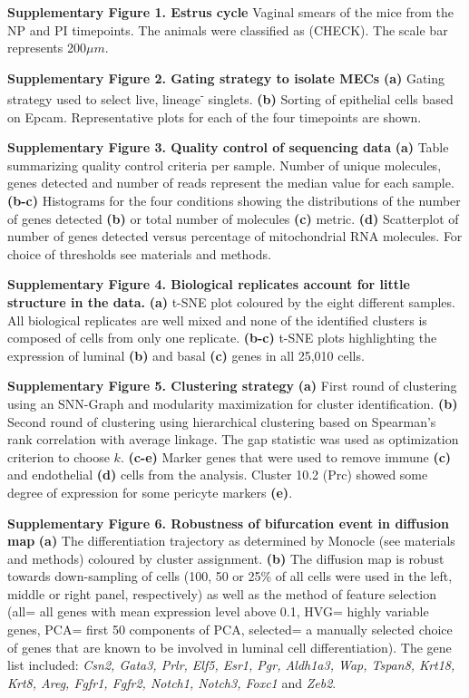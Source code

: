 \documentclass[titlepage, 12pt, oneside]{amsart}
\begin{document}
\textbf{Supplementary Figure 1. Estrus cycle}
Vaginal smears of the mice from the NP and PI timepoints. The animals were classified as (CHECK). The scale bar represents 200$\mu m$.

\textbf{Supplementary Figure 2. Gating strategy to isolate MECs}
\textbf{(a)} Gating strategy used to select live, lineage\textsuperscript{-} singlets.
\textbf{(b)} Sorting of epithelial cells based on Epcam. Representative plots for each of the four timepoints are shown.

\textbf{Supplementary Figure 3. Quality control of sequencing data}
\textbf{(a)} Table summarizing quality control criteria per sample.
Number of unique molecules, genes detected and number of reads represent the median value for each sample.
\textbf{(b-c)} Histograms for the four conditions showing the distributions of the number of genes detected \textbf{(b)} or total number of molecules \textbf{(c)} metric.
\textbf{(d)} Scatterplot of number of genes detected versus percentage of mitochondrial RNA molecules.
For choice of thresholds see materials and methods.

\textbf{Supplementary Figure 4. Biological replicates account for little structure in the data.}
\textbf{(a)} t-SNE plot coloured by the eight different samples. All biological replicates are well mixed and none of the identified clusters is composed of cells from only one replicate.
\textbf{(b-c)} t-SNE plots highlighting the expression of luminal \textbf{(b)} and basal \textbf{(c)} genes in all 25,010 cells.

\textbf{Supplementary Figure 5. Clustering strategy}
\textbf{(a)} First round of clustering using an SNN-Graph and modularity maximization for cluster identification.
\textbf{(b)} Second round of clustering using hierarchical clustering based on Spearman's rank correlation with average linkage.
The gap statistic was used as optimization criterion to choose $k$.
\textbf{(c-e)} Marker genes that were used to remove immune \textbf{(c)} and endothelial \textbf{(d)} cells from the analysis. Cluster 10.2 (Prc) showed some degree of expression for some pericyte markers \textbf{(e)}.

\textbf{Supplementary Figure 6. Robustness of bifurcation event in diffusion map}
\textbf{(a)} The differentiation trajectory as determined by Monocle (see materials and methods) coloured by cluster assignment.
\textbf{(b)} The diffusion map is robust towards down-sampling of cells (100, 50 or 25\% of all cells were used in the left, middle or right panel, respectively) as well as the method of feature selection (all= all genes with mean expression level above 0.1, HVG= highly variable genes, PCA= first 50 components of PCA, selected= a manually selected choice of genes that are known to be involved in luminal cell differentiation).
The gene list included: \textit{Csn2, Gata3, Prlr, Elf5, Esr1, Pgr, Aldh1a3, Wap, Tspan8, Krt18, Krt8, Areg, Fgfr1, Fgfr2, Notch1, Notch3, Foxc1} and \textit{Zeb2}.
\end{document}

